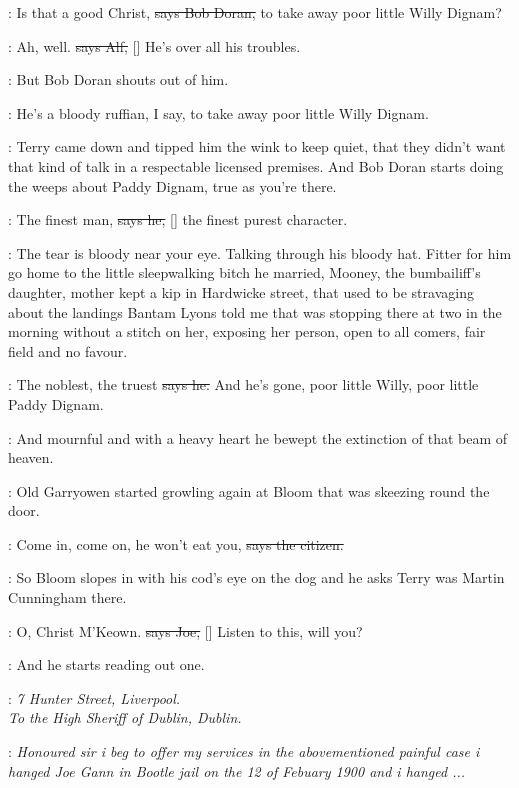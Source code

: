 \doran:
Is that a good Christ,
\sout{says Bob Doran,}
to take away poor little Willy
Dignam?

\bergan:
Ah,
well.
\sout{says Alf,}
[]
He's over all his troubles.

\Nq:
But Bob Doran shouts out of him.

\doran:
He's a bloody ruffian,
I say,
to take away poor little Willy Dignam.

\Nq:
Terry came down and tipped him the wink to keep quiet,
that they
didn't want that kind of talk in a respectable licensed premises.
And Bob
Doran starts doing the weeps about Paddy Dignam,
true as you're there.

\doran:
The finest man,
\sout{says he,}
[] the finest purest character.

\Nq:
The tear is bloody near your eye.
Talking through his bloody hat.
Fitter for him go home to the little sleepwalking bitch he married,
Mooney,
the bumbailiff's daughter,
mother kept a kip in Hardwicke street,
that used to be stravaging about the landings
Bantam Lyons told me that
was stopping there at two in the morning without a stitch on her,
exposing
her person,
open to all comers,
fair field and no favour.

\doran:
The noblest,
the truest
\sout{says he.}
And he's gone,
poor little Willy,
poor
little Paddy Dignam.

:
And mournful and with a heavy heart he bewept the extinction of that
beam of heaven.

\Nq:
Old Garryowen started growling again at Bloom that was skeezing
round the door.

\citizen:
Come in,
come on,
he won't eat you,
\sout{says the citizen.}

\Nq:
So Bloom slopes in with his cod's eye on the dog
and he asks Terry
was Martin Cunningham there.

\joe:
O,
Christ M'Keown.
\sout{says Joe,}
[]
Listen to this,
will you?

\Nq:
And he starts reading out one.


\joe:
\emph{7 Hunter Street,
Liverpool.\\
To the High Sheriff of Dublin,
Dublin.}

\joe:
\emph{Honoured sir i beg to offer my services in the abovementioned painful
case i hanged Joe Gann in Bootle jail on the 12 of Febuary 1900
and i
hanged ...}


